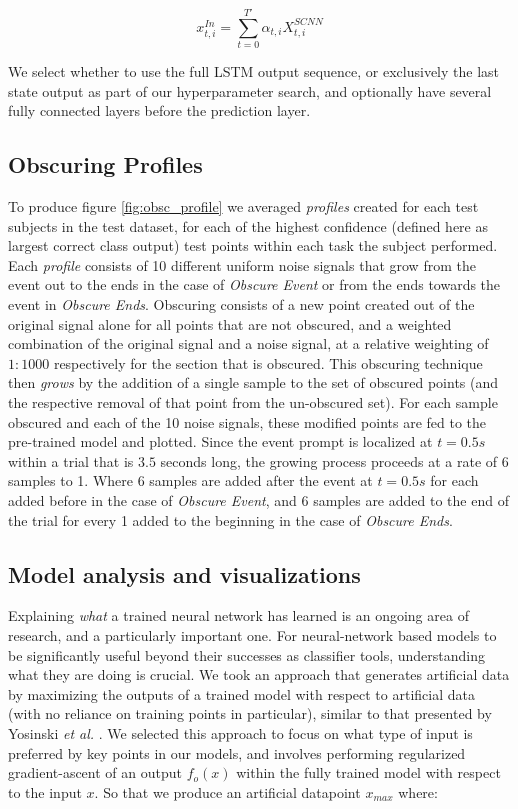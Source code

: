 \documentclass[fleqn,10pt]{wlscirep}
\begin{document}
\begin{equation}
  x_{t,i}^{In} = \sum_{t=0}^{T'} \alpha_{t,i} X_{t,i}^{SCNN}
\end{equation}

We select whether to use the full LSTM output sequence, or exclusively the last state output as part of our hyperparameter search, and optionally have several fully connected layers before the prediction layer.

\subsection*{Obscuring Profiles}

To produce figure \ref{fig:obsc_profile} we averaged {\em profiles} created for each test subjects in the test dataset, for each of the highest confidence (defined here as largest correct class output) test points within each task the subject performed. Each {\em profile} consists of 10 different uniform noise signals that grow from the event out to the ends in the case of {\em Obscure Event} or from the ends towards the event in {\em Obscure Ends}. Obscuring consists of a new point created out of the original signal alone for all points that are not obscured, and a weighted combination of the original signal and a noise signal, at a relative weighting of $1:1000$ respectively for the section that is obscured. This obscuring technique then {\em grows} by the addition of a single sample to the set of obscured points (and the respective removal of that point from the un-obscured set). For each sample obscured and each of the 10 noise signals, these modified points are fed to the pre-trained model and plotted. Since the event prompt is localized at $t=0.5s$ within a trial that is $3.5$ seconds long, the growing process proceeds at a rate of 6 samples to 1. Where 6 samples are added after the event at $t=0.5s$ for each added before in the case of {\em Obscure Event}, and 6 samples are added to the end of the trial for every 1 added to the beginning in the case of {\em Obscure Ends}.

\subsection*{Model analysis and visualizations} \label{sec:max_act}

Explaining {\em what} a trained neural network has learned is an ongoing area of research, and a particularly important one. For neural-network based models to be significantly useful beyond their successes as classifier tools, understanding what they are doing is crucial. We took an approach that generates artificial data by maximizing the outputs of a trained model with respect to artificial data (with no reliance on training points in particular), similar to that presented by Yosinski {\em et al.} \cite{Yosinski2015}. We selected this approach to focus on what type of input is preferred by key points in our models, and involves performing regularized gradient-ascent of an output $f_o(x)$ within the fully trained model with respect to the input $x$. So that we produce an artificial datapoint $x_{max}$ where:
\end{document}
